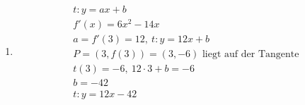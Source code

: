 \begin{enumerate}
\begin{align*}
              \lim_{h\to 0}\frac{(2+h)^3-2^3}{h} & = \lim_{h\to 0}\frac{8+12h+6h^2+h^3-8}{h} \\
                                                 & =\lim_{x\to h}\frac{12h+6h^2+h^3}{h}      \\
                                                 & =12
          \end{align*}
    \item \begin{align*}
              t: y=ax + b                                      \\
              f'(x)=6x^2-14x                                   \\
              a=f'(3)=12,\ t:y=12x+b                           \\
              P=(3,f(3))=(3,-6) \text{ liegt auf der Tangente} \\
              t(3)=-6,\ 12\cdot 3 + b= -6                      \\
              b=-42                                            \\
              t:y = 12x-42
          \end{align*}
\end{enumerate}